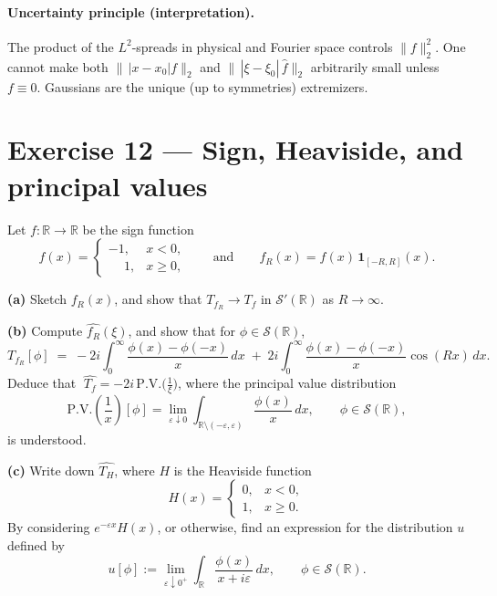 \documentclass[12pt,a4paper]{article}
\theoremstyle{plain}
\theoremstyle{definition}
\theoremstyle{remark}
\theoremstyle{remark}
\begin{document}
\smallskip

\paragraph{Uncertainty principle (interpretation).}
The product of the $L^2$-spreads in physical and Fourier space controls $\|f\|_2^2$.
One cannot make both $\|\,|x-x_0|f\|_2$ and $\|\,|\xi-\xi_0|\,\widehat f\|_2$ arbitrarily small unless $f\equiv0$.
Gaussians are the unique (up to symmetries) extremizers.



\section*{Exercise 12 — Sign, Heaviside, and principal values}


Let $f:\mathbb R\to\mathbb R$ be the sign function
\[
f(x)=
\begin{cases}
	-1,& x<0,\\
	\phantom{-}1,& x\ge 0,
\end{cases}
\qquad\text{and}\qquad
f_R(x)=f(x)\,\mathbf 1_{[-R,R]}(x).
\]

\noindent
\textbf{(a)} Sketch $f_R(x)$, and show that $T_{f_R}\to T_f$ in $\mathcal S'(\mathbb R)$ as $R\to\infty$.

\smallskip
\noindent
\textbf{(b)} Compute $\widehat{f_R}(\xi)$, and show that for $\phi\in\mathcal S(\mathbb R)$,
\[
T_{f_R}[\phi] \;=\; -2i\int_{0}^{\infty}\frac{\phi(x)-\phi(-x)}{x}\,dx
\;+\; 2i\int_{0}^{\infty}\frac{\phi(x)-\phi(-x)}{x}\cos(Rx)\,dx.
\]
Deduce that $\;\widehat{T_f}=-2i\,\mathrm{P.V.}\!\big(\frac{1}{\xi}\big)$, where the principal value distribution
\[
\mathrm{P.V.}\!\left(\frac{1}{x}\right)[\phi]
=\lim_{\varepsilon\downarrow 0}\int_{\mathbb R\setminus(-\varepsilon,\varepsilon)}\frac{\phi(x)}{x}\,dx,
\qquad \phi\in\mathcal S(\mathbb R),
\]
is understood.

\smallskip
\noindent
\textbf{(c)} Write down $\widehat{T_H}$, where $H$ is the Heaviside function
\[
H(x)=
\begin{cases}
	0,& x<0,\\
	1,& x\ge 0.
\end{cases}
\]
By considering $e^{-\varepsilon x}H(x)$, or otherwise, find an expression for the distribution $u$ defined by
\[
u[\phi]:=\lim_{\varepsilon\downarrow 0^+}\int_{\mathbb R}\frac{\phi(x)}{x+i\varepsilon}\,dx,
\qquad \phi\in\mathcal S(\mathbb R).
\]

\bigskip
\bigskip
\end{document}
